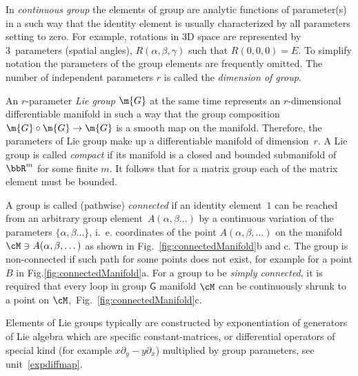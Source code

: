 \begin{unit}
In \textit{continuous group} the elements of group are analytic
functions of parameter(s) in a such way that the identity element
is usually characterized by all parameters setting to zero. For example,
rotations in 3D space are represented by 3~parameters (spatial
angles), $R(\alpha,\beta,\gamma)$ such that $R(0,0,0)=E$. To
simplify notation the parameters of the group elements are
frequently omitted. The number of independent parameters $r$ is
called the \textit{dimension of group}.

An $r$-parameter \textit{Lie group} $\m{G}$ at the same time
represents an $r$-dimensional differentiable manifold in such a
way that the group composition $\m{G}\circ\m{G}\rightarrow\m{G}$
is a smooth map on the manifold. Therefore, the parameters of Lie
group make up a differentiable manifold of dimension~$r$. A Lie
group is called \textit{compact} if its manifold is a closed and
bounded submanifold of $\bbR^m$ for some finite $m$. It follows
that for a matrix group each of the matrix element must be
bounded.

A group is called (pathwise) \textit{connected} if an identity
element~$1$ can be reached from an arbitrary group
element~$A(\alpha,\beta\dots)$ by a continuous variation of the
parameters $\{\alpha,\beta\dots\}$, i.~e. coordinates of the
point $A(\alpha,\beta,\dots)$ on the manifold $\cM\ni A(\alpha,\beta,\dots)$ as shown in
Fig.~\ref{fig:connectedManifold}b and c. The group is
non-connected if such path for some points does not exist, for
example for a point $B$ in Fig.\ref{fig:connectedManifold}a. For a
group to be \textit{simply connected}, it is required that every
loop in group $\mathsf{G}$ manifold $\cM$ can be continuously shrunk
 to a point on $\cM$,~Fig.~\ref{fig:connectedManifold}c.

Elements of Lie groups typically are constructed by exponentiation
of generators of Lie algebra which are specific constant-matrices,
or differential operators of special kind (for example
$x\partial_y-y\partial_x$) multiplied by group parameters, see unit~\ref{expdiffmap}.
\end{unit}
%
